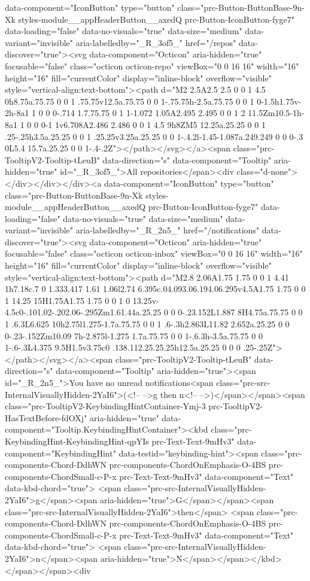 {{{data-component="IconButton" type="button" class="prc-Button-ButtonBase-9n-Xk styles-module__appHeaderButton__axedQ prc-Button-IconButton-fyge7" data-loading="false" data-no-visuals="true" data-size="medium" data-variant="invisible" aria-labelledby="_R_3of5_" href="/repos" data-discover="true"><svg data-component="Octicon" aria-hidden="true" focusable="false" class="octicon octicon-repo" viewBox="0 0 16 16" width="16" height="16" fill="currentColor" display="inline-block" overflow="visible" style="vertical-align:text-bottom"><path d="M2 2.5A2.5 2.5 0 0 1 4.5 0h8.75a.75.75 0 0 1 .75.75v12.5a.75.75 0 0 1-.75.75h-2.5a.75.75 0 0 1 0-1.5h1.75v-2h-8a1 1 0 0 0-.714 1.7.75.75 0 1 1-1.072 1.05A2.495 2.495 0 0 1 2 11.5Zm10.5-1h-8a1 1 0 0 0-1 1v6.708A2.486 2.486 0 0 1 4.5 9h8ZM5 12.25a.25.25 0 0 1 .25-.25h3.5a.25.25 0 0 1 .25.25v3.25a.25.25 0 0 1-.4.2l-1.45-1.087a.249.249 0 0 0-.3 0L5.4 15.7a.25.25 0 0 1-.4-.2Z"></path></svg></a><span class="prc-TooltipV2-Tooltip-tLeuB" data-direction="s" data-component="Tooltip" aria-hidden="true" id="_R_3of5_">All repositories</span><div class="d-none"></div></div></div><a data-component="IconButton" type="button" class="prc-Button-ButtonBase-9n-Xk styles-module__appHeaderButton__axedQ prc-Button-IconButton-fyge7" data-loading="false" data-no-visuals="true" data-size="medium" data-variant="invisible" aria-labelledby="_R_2n5_" href="/notifications" data-discover="true"><svg data-component="Octicon" aria-hidden="true" focusable="false" class="octicon octicon-inbox" viewBox="0 0 16 16" width="16" height="16" fill="currentColor" display="inline-block" overflow="visible" style="vertical-align:text-bottom"><path d="M2.8 2.06A1.75 1.75 0 0 1 4.41 1h7.18c.7 0 1.333.417 1.61 1.06l2.74 6.395c.04.093.06.194.06.295v4.5A1.75 1.75 0 0 1 14.25 15H1.75A1.75 1.75 0 0 1 0 13.25v-4.5c0-.101.02-.202.06-.295Zm1.61.44a.25.25 0 0 0-.23.152L1.887 8H4.75a.75.75 0 0 1 .6.3L6.625 10h2.75l1.275-1.7a.75.75 0 0 1 .6-.3h2.863L11.82 2.652a.25.25 0 0 0-.23-.152Zm10.09 7h-2.875l-1.275 1.7a.75.75 0 0 1-.6.3h-3.5a.75.75 0 0 1-.6-.3L4.375 9.5H1.5v3.75c0 .138.112.25.25.25h12.5a.25.25 0 0 0 .25-.25Z"></path></svg></a><span class="prc-TooltipV2-Tooltip-tLeuB" data-direction="s" data-component="Tooltip" aria-hidden="true"><span id="_R_2n5_">You have no unread notifications<span class="prc-src-InternalVisuallyHidden-2YaI6">(<!-- -->g then n<!-- -->)</span></span><span class="prc-TooltipV2-KeybindingHintContainer-Ymj-3 prc-TooltipV2-HasTextBefore-fdOXj" aria-hidden="true" data-component="Tooltip.KeybindingHintContainer"><kbd class="prc-KeybindingHint-KeybindingHint-qpYIs prc-Text-Text-9mHv3" data-component="KeybindingHint" data-testid="keybinding-hint"><span class="prc-components-Chord-DdhWN prc-components-ChordOnEmphasis-O-4BS prc-components-ChordSmall-c-P-x prc-Text-Text-9mHv3" data-component="Text" data-kbd-chord="true"> <span class="prc-src-InternalVisuallyHidden-2YaI6">g</span><span aria-hidden="true">G</span></span><span class="prc-src-InternalVisuallyHidden-2YaI6">then</span> <span class="prc-components-Chord-DdhWN prc-components-ChordOnEmphasis-O-4BS prc-components-ChordSmall-c-P-x prc-Text-Text-9mHv3" data-component="Text" data-kbd-chord="true"> <span class="prc-src-InternalVisuallyHidden-2YaI6">n</span><span aria-hidden="true">N</span></span></kbd></span></span><div }}}

